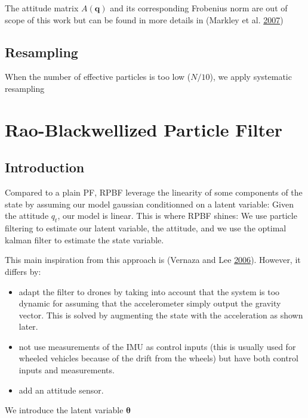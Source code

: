 \documentclass[]{article}
\providecommand{\tightlist}{%
  \setlength{\itemsep}{0pt}\setlength{\parskip}{0pt}}
\begin{document}
The attitude matrix \(A(\mathbf{q})\) and its corresponding Frobenius
norm are out of scope of this work but can be found in more details in
(Markley et al. \protect\hyperlink{ref-markley_averaging_2007}{2007})

\subsection{Resampling}\label{resampling}

When the number of effective particles is too low (\(N/10\)), we apply
systematic resampling

\section{Rao-Blackwellized Particle
Filter}\label{rao-blackwellized-particle-filter}

\subsection{Introduction}\label{introduction-1}

Compared to a plain PF, RPBF leverage the linearity of some components
of the state by assuming our model gaussian conditionned on a latent
variable: Given the attitude \(q_t\), our model is linear. This is where
RPBF shines: We use particle filtering to estimate our latent variable,
the attitude, and we use the optimal kalman filter to estimate the state
variable.

This main inspiration from this approach is (Vernaza and Lee
\protect\hyperlink{ref-vernaza_rao-blackwellized_2006}{2006}). However,
it differs by:

\begin{itemize}
\tightlist
\item
  adapt the filter to drones by taking into account that the system is
  too dynamic for assuming that the accelerometer simply output the
  gravity vector. This is solved by augmenting the state with the
  acceleration as shown later.
\item
  not use measurements of the IMU as control inputs (this is usually
  used for wheeled vehicles because of the drift from the wheels) but
  have both control inputs and measurements.
\item
  add an attitude sensor.
\end{itemize}

We introduce the latent variable \(\boldsymbol{\theta}\)
\end{document}
